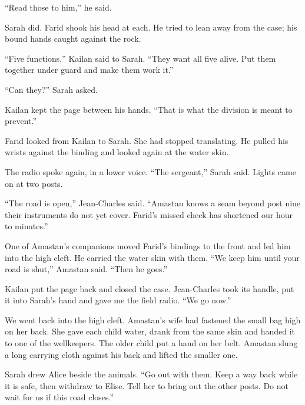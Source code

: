 ``Read those to him,'' he said.\par

Sarah did. Farid shook his head at each. He tried to lean away from the case; his bound hands caught against the rock.\par

``Five functions,'' Kailan said to Sarah. ``They want all five alive. Put them together under guard and make them work it.''\par

``Can they?'' Sarah asked.\par

Kailan kept the page between his hands. ``That is what the division is meant to prevent.''\par

Farid looked from Kailan to Sarah. She had stopped translating. He pulled his wrists against the binding and looked again at the water skin.\par

The radio spoke again, in a lower voice. ``The sergeant,'' Sarah said. Lights came on at two posts.\par

``The road is open,'' Jean-Charles said. ``Amastan knows a seam beyond post nine their instruments do not yet cover. Farid's missed check has shortened our hour to minutes.''\par

One of Amastan's companions moved Farid's bindings to the front and led him into the high cleft. He carried the water skin with them. ``We keep him until your road is shut,'' Amastan said. ``Then he goes.''\par

Kailan put the page back and closed the case. Jean-Charles took its handle, put it into Sarah's hand and gave me the field radio. ``We go now.''\par

We went back into the high cleft. Amastan's wife had fastened the small bag high on her back. She gave each child water, drank from the same skin and handed it to one of the wellkeepers. The older child put a hand on her belt. Amastan slung a long carrying cloth against his back and lifted the smaller one.\par

Sarah drew Alice beside the animals. ``Go out with them. Keep a way back while it is safe, then withdraw to Elise. Tell her to bring out the other posts. Do not wait for us if this road closes.''\par

